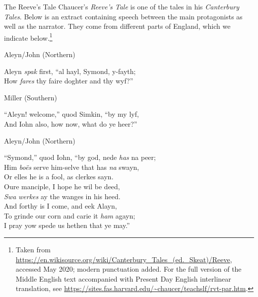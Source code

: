 \begin{texts}{The Reeve's Tale}\label{ME-reeve}
Chaucer's \textit{Reeve's Tale} is one of the tales in his \textit{Canterbury Tales}. Below is an extract containing speech between the main protagonists as well as the narrator. They come from different parts of England, which we indicate below.\footnote{Taken from \url{https://en.wikisource.org/wiki/Canterbury_Tales_(ed._Skeat)/Reeve}, accessed May 2020; modern punctuation added. For the full version of the Middle English text accompanied with Present Day English interlinear translation, see \url{https://sites.fas.harvard.edu/~chaucer/teachslf/rvt-par.htm}.}

\begin{textglossed}
Aleyn/John (Northern)

Aleyn \emph{spak} first, ``al hayl, Symond, y-fayth;\\
How \emph{fares} thy faire doghter and thy wyf?''

Miller (Southern)

``Aleyn! welcome,'' quod Simkin, ``by my lyf, \\
And Iohn also, how now, what do ye heer?'' 

Aleyn/John (Northern)

``Symond,'' quod Iohn, ``by god, nede \emph{has} na peer; \\
Him \emph{bo\"{e}s} serve him-selve that has \emph{na} swayn, \\
Or elles he is a fool, as clerkes sayn.\\
Oure manciple, I hope he wil be deed,\\
\emph{Swa} \emph{werkes} ay the wanges in his heed.\\
And forthy is I come, and eek Alayn, \\
To grinde our corn and carie it \emph{ham} agayn;\\ 
I pray yow spede us hethen that ye may.''


\end{textglossed}
\end{texts}
